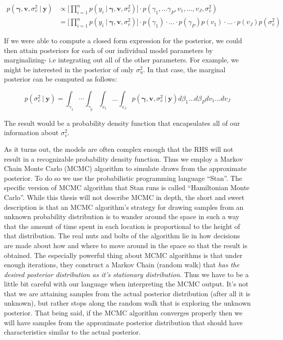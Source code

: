 \documentclass[12pt,twoside]{reedthesis}
\begin{document}
\[
\begin{aligned}
p(\boldsymbol{\gamma}, \mathbf{v},  \sigma_v^2 \ | \ \mathbf{y}) &\propto \bigg[\prod_{i=1}^np(y_i \ | \ \boldsymbol{\gamma}, \mathbf{v},  \sigma_v^2)\bigg]\cdot p(\gamma_1, ...\gamma_P, v_1,... ,v_J, \sigma_{v}^2) \\
 &= \bigg[\prod_{i=1}^np(y_i \ | \ \boldsymbol{\gamma}, \mathbf{v},  \sigma_{v}^2)\bigg]\cdot p(\gamma_1)\cdot...\cdot p(\gamma_P)p(v_1) \cdot ... \cdot p(v_J)p(\sigma_{v}^2)
\end{aligned}
\]

If we were able to compute a closed form expression for the posterior, we could then attain posteriors for each of our individual model parameters by marginalizing- i.e integrating out all of the other parameters. For example, we might be interested in the posterior of only \(\sigma_u^2\). In that case, the marginal posterior can be computed as follows:

\[
p(\sigma_{v}^2 \ | \ \mathbf{y}) = \int_{\gamma_1} \cdots \int_{\gamma_p} \int_{v_1} \dots \int_{v_J} p(\boldsymbol{\gamma}, \mathbf{v},  \sigma_{v}^2 \ | \ \mathbf{y}) d\beta_1 ... d\beta_P dv_1 ... dv_J
\]

The result would be a probability density function that encapsulates all of our information about \(\sigma_{v}^2\).

As it turns out, the models are often complex enough that the RHS will not result in a recognizable probability density function. Thus we employ a Markov Chain Monte Carlo (MCMC) algorithm to simulate draws from the approximate posterior. To do so we use the probabilistic programming language ``Stan''. The specific version of MCMC algorithm that Stan runs is called ``Hamiltonian Monte Carlo''. While this thesis will not describe MCMC in depth, the short and sweet description is that an MCMC algorithm's strategy for drawing samples from an unknown probability distribution is to wander around the space in such a way that the amount of time spent in each location is proportional to the height of that distribution. The real nuts and bolts of the algorithm lie in how decisions are made about how and where to move around in the space so that the result is obtained. The especially powerful thing about MCMC algorithms is that under enough iterations, they construct a Markov Chain (random walk) that \emph{has the desired posterior distribution as it's stationary distribution.} Thus we have to be a little bit careful with our language when interpreting the MCMC output. It's not that we are attaining samples from the actual posterior distribution (after all it is unknown), but rather stops along the random walk that is exploring the unknown posterior. That being said, if the MCMC algorithm converges properly then we will have samples from the approximate posterior distribution that should have characteristics similar to the actual posterior.
\end{document}
